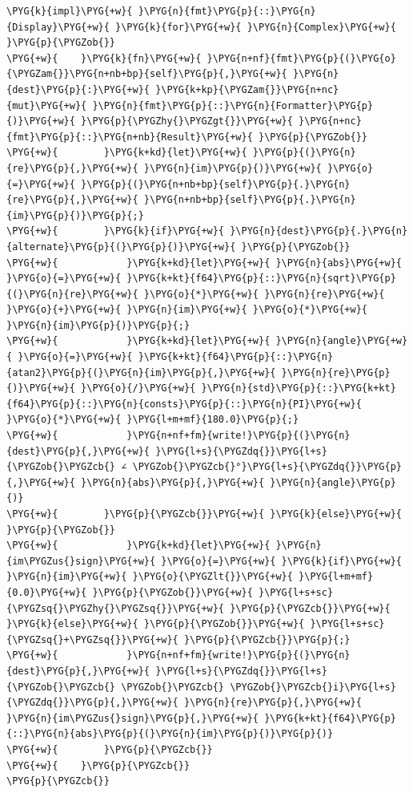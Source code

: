 \begin{Verbatim}[commandchars=\\\{\},breaklines=true,breakanywhere=true,fontsize=\codefont,xleftmargin=17bp]
\PYG{k}{impl}\PYG{+w}{ }\PYG{n}{fmt}\PYG{p}{::}\PYG{n}{Display}\PYG{+w}{ }\PYG{k}{for}\PYG{+w}{ }\PYG{n}{Complex}\PYG{+w}{ }\PYG{p}{\PYGZob{}}
\PYG{+w}{    }\PYG{k}{fn}\PYG{+w}{ }\PYG{n+nf}{fmt}\PYG{p}{(}\PYG{o}{\PYGZam{}}\PYG{n+nb+bp}{self}\PYG{p}{,}\PYG{+w}{ }\PYG{n}{dest}\PYG{p}{:}\PYG{+w}{ }\PYG{k+kp}{\PYGZam{}}\PYG{n+nc}{mut}\PYG{+w}{ }\PYG{n}{fmt}\PYG{p}{::}\PYG{n}{Formatter}\PYG{p}{)}\PYG{+w}{ }\PYG{p}{\PYGZhy{}\PYGZgt{}}\PYG{+w}{ }\PYG{n+nc}{fmt}\PYG{p}{::}\PYG{n+nb}{Result}\PYG{+w}{ }\PYG{p}{\PYGZob{}}
\PYG{+w}{        }\PYG{k+kd}{let}\PYG{+w}{ }\PYG{p}{(}\PYG{n}{re}\PYG{p}{,}\PYG{+w}{ }\PYG{n}{im}\PYG{p}{)}\PYG{+w}{ }\PYG{o}{=}\PYG{+w}{ }\PYG{p}{(}\PYG{n+nb+bp}{self}\PYG{p}{.}\PYG{n}{re}\PYG{p}{,}\PYG{+w}{ }\PYG{n+nb+bp}{self}\PYG{p}{.}\PYG{n}{im}\PYG{p}{)}\PYG{p}{;}
\PYG{+w}{        }\PYG{k}{if}\PYG{+w}{ }\PYG{n}{dest}\PYG{p}{.}\PYG{n}{alternate}\PYG{p}{(}\PYG{p}{)}\PYG{+w}{ }\PYG{p}{\PYGZob{}}
\PYG{+w}{            }\PYG{k+kd}{let}\PYG{+w}{ }\PYG{n}{abs}\PYG{+w}{ }\PYG{o}{=}\PYG{+w}{ }\PYG{k+kt}{f64}\PYG{p}{::}\PYG{n}{sqrt}\PYG{p}{(}\PYG{n}{re}\PYG{+w}{ }\PYG{o}{*}\PYG{+w}{ }\PYG{n}{re}\PYG{+w}{ }\PYG{o}{+}\PYG{+w}{ }\PYG{n}{im}\PYG{+w}{ }\PYG{o}{*}\PYG{+w}{ }\PYG{n}{im}\PYG{p}{)}\PYG{p}{;}
\PYG{+w}{            }\PYG{k+kd}{let}\PYG{+w}{ }\PYG{n}{angle}\PYG{+w}{ }\PYG{o}{=}\PYG{+w}{ }\PYG{k+kt}{f64}\PYG{p}{::}\PYG{n}{atan2}\PYG{p}{(}\PYG{n}{im}\PYG{p}{,}\PYG{+w}{ }\PYG{n}{re}\PYG{p}{)}\PYG{+w}{ }\PYG{o}{/}\PYG{+w}{ }\PYG{n}{std}\PYG{p}{::}\PYG{k+kt}{f64}\PYG{p}{::}\PYG{n}{consts}\PYG{p}{::}\PYG{n}{PI}\PYG{+w}{ }\PYG{o}{*}\PYG{+w}{ }\PYG{l+m+mf}{180.0}\PYG{p}{;}
\PYG{+w}{            }\PYG{n+nf+fm}{write!}\PYG{p}{(}\PYG{n}{dest}\PYG{p}{,}\PYG{+w}{ }\PYG{l+s}{\PYGZdq{}}\PYG{l+s}{\PYGZob{}\PYGZcb{} ∠ \PYGZob{}\PYGZcb{}°}\PYG{l+s}{\PYGZdq{}}\PYG{p}{,}\PYG{+w}{ }\PYG{n}{abs}\PYG{p}{,}\PYG{+w}{ }\PYG{n}{angle}\PYG{p}{)}
\PYG{+w}{        }\PYG{p}{\PYGZcb{}}\PYG{+w}{ }\PYG{k}{else}\PYG{+w}{ }\PYG{p}{\PYGZob{}}
\PYG{+w}{            }\PYG{k+kd}{let}\PYG{+w}{ }\PYG{n}{im\PYGZus{}sign}\PYG{+w}{ }\PYG{o}{=}\PYG{+w}{ }\PYG{k}{if}\PYG{+w}{ }\PYG{n}{im}\PYG{+w}{ }\PYG{o}{\PYGZlt{}}\PYG{+w}{ }\PYG{l+m+mf}{0.0}\PYG{+w}{ }\PYG{p}{\PYGZob{}}\PYG{+w}{ }\PYG{l+s+sc}{\PYGZsq{}\PYGZhy{}\PYGZsq{}}\PYG{+w}{ }\PYG{p}{\PYGZcb{}}\PYG{+w}{ }\PYG{k}{else}\PYG{+w}{ }\PYG{p}{\PYGZob{}}\PYG{+w}{ }\PYG{l+s+sc}{\PYGZsq{}+\PYGZsq{}}\PYG{+w}{ }\PYG{p}{\PYGZcb{}}\PYG{p}{;}
\PYG{+w}{            }\PYG{n+nf+fm}{write!}\PYG{p}{(}\PYG{n}{dest}\PYG{p}{,}\PYG{+w}{ }\PYG{l+s}{\PYGZdq{}}\PYG{l+s}{\PYGZob{}\PYGZcb{} \PYGZob{}\PYGZcb{} \PYGZob{}\PYGZcb{}i}\PYG{l+s}{\PYGZdq{}}\PYG{p}{,}\PYG{+w}{ }\PYG{n}{re}\PYG{p}{,}\PYG{+w}{ }\PYG{n}{im\PYGZus{}sign}\PYG{p}{,}\PYG{+w}{ }\PYG{k+kt}{f64}\PYG{p}{::}\PYG{n}{abs}\PYG{p}{(}\PYG{n}{im}\PYG{p}{)}\PYG{p}{)}
\PYG{+w}{        }\PYG{p}{\PYGZcb{}}
\PYG{+w}{    }\PYG{p}{\PYGZcb{}}
\PYG{p}{\PYGZcb{}}
\end{Verbatim}

